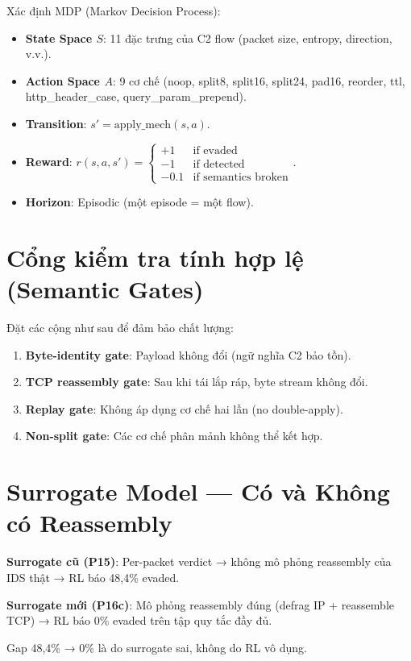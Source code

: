\documentclass[12pt, a4paper, openany]{book}
\begin{document}
Xác định MDP (Markov Decision Process):
\begin{itemize}
    \item \textbf{State Space $S$}: 11 đặc trưng của C2 flow (packet size, entropy, direction, v.v.).
    \item \textbf{Action Space $A$}: 9 cơ chế (noop, split8, split16, split24, pad16, reorder, ttl, http\_header\_case, query\_param\_prepend).
    \item \textbf{Transition}: $s' = \text{apply\_mech}(s, a)$.
    \item \textbf{Reward}: $r(s, a, s') = \begin{cases} +1 & \text{if evaded} \\ -1 & \text{if detected} \\ -0.1 & \text{if semantics broken} \end{cases}$.
    \item \textbf{Horizon}: Episodic (một episode = một flow).
\end{itemize}

\section{Cổng kiểm tra tính hợp lệ (Semantic Gates)}

Đặt các cộng như sau để đảm bảo chất lượng:
\begin{enumerate}
    \item \textbf{Byte-identity gate}: Payload không đổi (ngữ nghĩa C2 bảo tồn).
    \item \textbf{TCP reassembly gate}: Sau khi tái lắp ráp, byte stream không đổi.
    \item \textbf{Replay gate}: Không áp dụng cơ chế hai lần (no double-apply).
    \item \textbf{Non-split gate}: Các cơ chế phân mảnh không thể kết hợp.
\end{enumerate}

\section{Surrogate Model — Có và Không có Reassembly}

\textbf{Surrogate cũ (P15)}: Per-packet verdict → không mô phỏng reassembly của IDS thật → RL báo 48,4\% evaded.

\textbf{Surrogate mới (P16c)}: Mô phỏng reassembly đúng (defrag IP + reassemble TCP) → RL báo 0\% evaded trên tập quy tắc đầy đủ.

Gap 48,4\% → 0\% là do surrogate sai, không do RL vô dụng.
\end{document}
